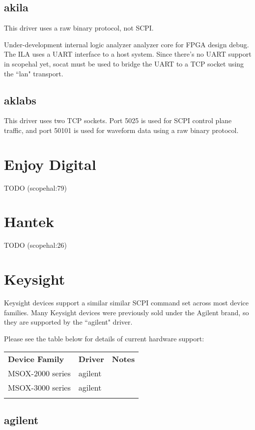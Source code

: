 \subsection{akila}

This driver uses a raw binary protocol, not SCPI.

Under-development internal logic analyzer analyzer core for FPGA design debug. The ILA uses a UART interface to a host
system. Since there's no UART support in scopehal yet, socat must be used to bridge the UART to a TCP socket using
the ``lan" transport.

\subsection{aklabs}

This driver uses two TCP sockets. Port 5025 is used for SCPI control plane traffic, and port 50101 is used for waveform
data using a raw binary protocol.

\section{Enjoy Digital}
TODO (scopehal:79)

\section{Hantek}
TODO (scopehal:26)

\section{Keysight}

Keysight devices support a similar similar SCPI command set across most device families. Many Keysight devices were previously sold under the Agilent brand, so they are supported by the ``agilent" driver.

Please see the table below for details of current hardware support:

\begin{tabularx}{16cm}{llX}
\thickhline
\textbf{Device Family} & \textbf{Driver} & \textbf{Notes} \\
\thickhline
MSOX-2000 series & agilent &  \\
\thickhline
MSOX-3000 series & agilent &  \\
\thickhline
\end{tabularx}

\subsection{agilent}

